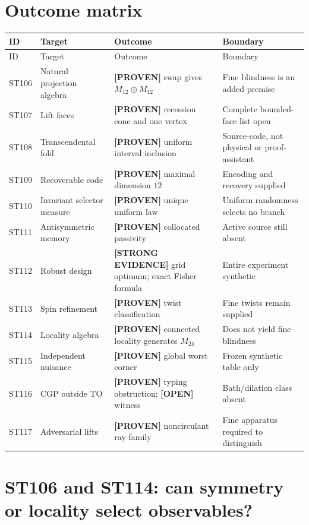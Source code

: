 \documentclass[11pt,a4paper]{article}
\newcommand{\proven}{\textcolor{green!40!black}{\textbf{[PROVEN]}}}
\newcommand{\strong}{\textcolor{blue!70!black}{\textbf{[STRONG EVIDENCE]}}}
\newcommand{\openstatus}{\textcolor{red!72!black}{\textbf{[OPEN]}}}
\begin{document}
\section{Outcome matrix}
\small
\begin{longtable}{@{}p{}p{}p{}p{}@{}}
\toprule ID & Target & Outcome & Boundary\\\midrule\endfirsthead
\toprule ID & Target & Outcome & Boundary\\\midrule\endhead
ST106 & Natural projection algebra & \proven{} swap gives $M_{12}\oplus M_{12}$ & Fine blindness is an added premise\\
ST107 & Lift faces & \proven{} recession cone and one vertex & Complete bounded-face list open\\
ST108 & Transcendental fold & \proven{} uniform interval inclusion & Source-code, not physical or proof-assistant\\
ST109 & Recoverable code & \proven{} maximal dimension $12$ & Encoding and recovery supplied\\
ST110 & Invariant selector measure & \proven{} unique uniform law & Uniform randomness selects no branch\\
ST111 & Antisymmetric memory & \proven{} collocated passivity & Active source still absent\\
ST112 & Robust design & \strong{} grid optimum; exact Fisher formula & Entire experiment synthetic\\
ST113 & Spin refinement & \proven{} twist classification & Fine twists remain supplied\\
ST114 & Locality algebra & \proven{} connected locality generates $M_{24}$ & Does not yield fine blindness\\
ST115 & Independent nuisance & \proven{} global worst corner & Frozen synthetic table only\\
ST116 & CGP outside TO & \proven{} typing obstruction; \openstatus{} witness & Bath/dilation class absent\\
ST117 & Adversarial lifts & \proven{} noncirculant ray family & Fine apparatus required to distinguish\\
\bottomrule
\end{longtable}
\normalsize

\section{ST106 and ST114: can symmetry or locality select observables?}
\end{document}
